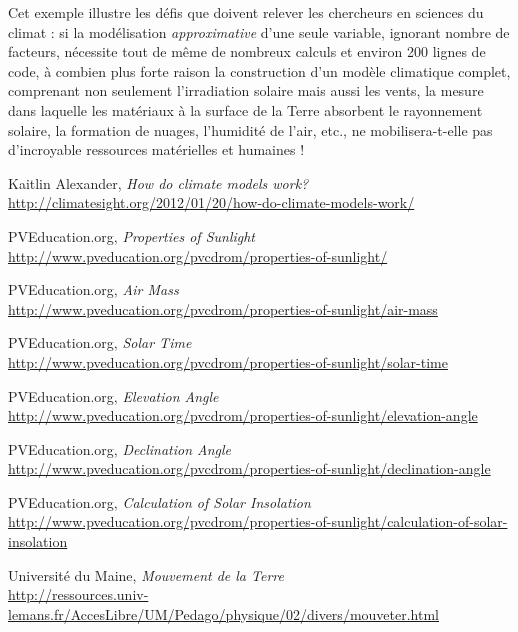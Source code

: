 \documentclass[12pt]{article}
\begin{document}
Cet exemple illustre les défis que doivent relever les chercheurs en sciences du climat : si la modélisation \emph{approximative} d'une seule variable, ignorant nombre de facteurs, nécessite tout de même de nombreux calculs et environ 200 lignes de code, à combien plus forte raison la construction d'un modèle climatique complet, comprenant non seulement l'irradiation solaire mais aussi les vents, la mesure dans laquelle les matériaux à la surface de la Terre absorbent le rayonnement solaire, la formation de nuages, l'humidité de l'air, etc., ne mobilisera-t-elle pas d'incroyable ressources matérielles et humaines !


\clearpage
\begin{thebibliography}{99}

	Kaitlin Alexander,
	\emph{How do climate models work?}\\
	\url{http://climatesight.org/2012/01/20/how-do-climate-models-work/}

	PVEducation.org,
	\emph{Properties of Sunlight}\\
	\url{http://www.pveducation.org/pvcdrom/properties-of-sunlight/}

	PVEducation.org,
	\emph{Air Mass}\\
	\url{http://www.pveducation.org/pvcdrom/properties-of-sunlight/air-mass}

	PVEducation.org,
	\emph{Solar Time}\\
	\url{http://www.pveducation.org/pvcdrom/properties-of-sunlight/solar-time}

	PVEducation.org,
	\emph{Elevation Angle}\\
	\url{http://www.pveducation.org/pvcdrom/properties-of-sunlight/elevation-angle}

	PVEducation.org,
	\emph{Declination Angle}\\
	\url{http://www.pveducation.org/pvcdrom/properties-of-sunlight/declination-angle}

	PVEducation.org,
	\emph{Calculation of Solar Insolation}\\
	\url{http://www.pveducation.org/pvcdrom/properties-of-sunlight/calculation-of-solar-insolation}

	Université du Maine,
	\emph{Mouvement de la Terre}\\
	\url{http://ressources.univ-lemans.fr/AccesLibre/UM/Pedago/physique/02/divers/mouveter.html}


\end{thebibliography}
\end{document}
